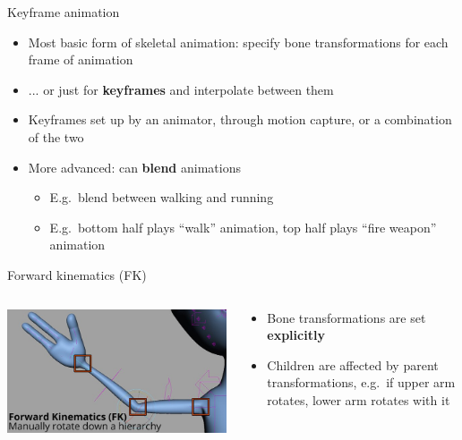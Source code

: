 \begin{frame}{Keyframe animation}
	\begin{itemize}
		\pause\item Most basic form of skeletal animation: specify bone transformations for each frame of animation
		\pause\item ... or just for \textbf{keyframes} and interpolate between them
		\pause\item Keyframes set up by an animator, through motion capture, or a combination of the two
		\pause\item More advanced: can \textbf{blend} animations
			\begin{itemize}
				\pause\item E.g.\ blend between walking and running
				\pause\item E.g.\ bottom half plays ``walk'' animation, top half plays ``fire weapon'' animation
			\end{itemize}
	\end{itemize}
\end{frame}

\begin{frame}{Forward kinematics (FK)}
	\begin{columns}
		\begin{column}{0.4\textwidth}
			\includegraphics[width=\textwidth]{forward_kinematics}
		\end{column}
		\begin{column}{0.58\textwidth}
			\begin{itemize}
				\pause\item Bone transformations are set \textbf{explicitly}
				\pause\item Children are affected by parent transformations,
					e.g.\ if upper arm rotates, lower arm rotates with it
			\end{itemize}
		\end{column}
	\end{columns}
\end{frame}

